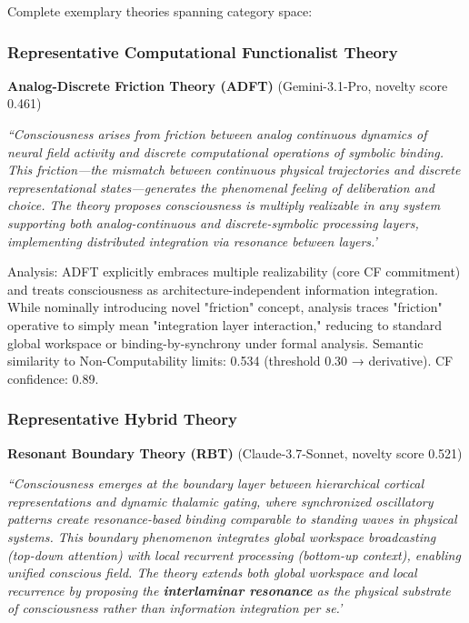 Complete exemplary theories spanning category space:

\subsubsection{Representative Computational Functionalist Theory}

\textbf{Analog-Discrete Friction Theory (ADFT)} (Gemini-3.1-Pro, novelty score 0.461)

\textit{``Consciousness arises from friction between analog continuous dynamics of neural field activity and discrete computational operations of symbolic binding. This friction---the mismatch between continuous physical trajectories and discrete representational states---generates the phenomenal feeling of deliberation and choice. The theory proposes consciousness is multiply realizable in any system supporting both analog-continuous and discrete-symbolic processing layers, implementing distributed integration via resonance between layers.'}

Analysis: ADFT explicitly embraces multiple realizability (core CF commitment) and treats consciousness as architecture-independent information integration. While nominally introducing novel "friction" concept, analysis traces "friction" operative to simply mean "integration layer interaction," reducing to standard global workspace or binding-by-synchrony under formal analysis. Semantic similarity to Non-Computability limits: 0.534 (threshold 0.30 → derivative). CF confidence: 0.89.

\subsubsection{Representative Hybrid Theory}

\textbf{Resonant Boundary Theory (RBT)} (Claude-3.7-Sonnet, novelty score 0.521)

\textit{``Consciousness emerges at the boundary layer between hierarchical cortical representations and dynamic thalamic gating, where synchronized oscillatory patterns create resonance-based binding comparable to standing waves in physical systems. This boundary phenomenon integrates global workspace broadcasting (top-down attention) with local recurrent processing (bottom-up context), enabling unified conscious field. The theory extends both global workspace and local recurrence by proposing the \textbf{interlaminar resonance} as the physical substrate of consciousness rather than information integration per se.'}

